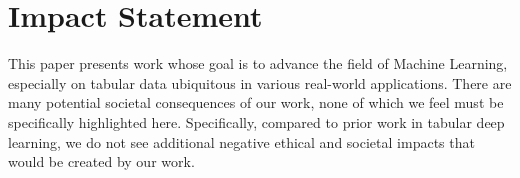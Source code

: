 \section*{Impact Statement}
This paper presents work whose goal is to advance the field of Machine Learning, especially on tabular data ubiquitous in various real-world applications. There are many potential societal consequences of our work, none of which we feel must be specifically highlighted here. Specifically, compared to prior work in tabular deep learning, we do not see additional negative ethical and societal impacts that would be created by our work.
